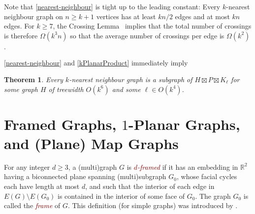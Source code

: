 \documentclass{patmorin}
\theoremstyle{plain}
\newtheorem{thm}{Theorem}
\theoremstyle{definition}
\newcommand{\defin}[1]{\textcolor{Maroon}{\emph{#1}}}
\newcommand{\note}[2]{\noindent{\color{red}[#1:~#2]}}
\renewcommand{\ge}{\geqslant}
\newcommand{\R}{\mathbb{R}}
\begin{document}
Note that \cref{nearest-neighbour} is tight up to the leading constant:  Every $k$-nearest neighbour graph on $n\ge k+1$ vertices has at least $kn/2$ edges and at most $kn$ edges.  For $k\ge 7$, the Crossing Lemma~\citep{ajtai.chvatal.ea:crossing-free,leighton:complexity} implies that the total number of crossings is therefore $\Omega(k^3n)$ so that the average number of crossings per edge is $\Omega(k^2)$.

\cref{nearest-neighbour} and \cref{kPlanarProduct} immediately imply


\begin{thm}\label{nn_product_structure}
  Every $k$-nearest neighbour graph is a subgraph of $H\boxtimes P\boxtimes K_{\ell}$ for some graph $H$ of treewidth $O(k^6)$ and some $\ell\in O(k^4)$.
\end{thm}

\section{Framed Graphs, $1$-Planar Graphs, and (Plane) Map Graphs}
\label{FramedSection}

%

%


For any integer $d\ge 3$, a (multi)graph $G$ is \defin{$d$-framed} if it has an embedding in $\R^2$ having a biconnected plane spanning (multi)subgraph $G_0$, whose facial cycles each have length at most $d$,  and such that the interior of each edge in $E(G)\setminus E(G_0)$ is contained in the interior of some face of $G_0$. The graph $G_0$ is called the \defin{frame} of $G$. This definition (for simple graphs) was introduced by \citet{BDGGMR}.
\end{document}
